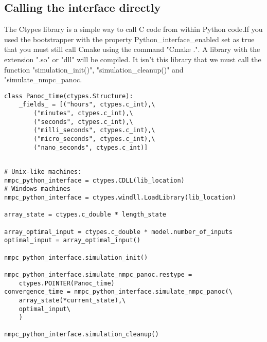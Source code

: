 \subsection{Calling the interface directly}
The Ctypes library is a simple way to call C  code from within Python code.If you used the bootstrapper  with the property Python\_interface\_enabled set as true that you must still call Cmake  using the command "Cmake .". A library with the extension ".so" or "dll" will be compiled. It isn't this library that we must call the function "simulation\_init()", "simulation\_cleanup()" and "simulate\_nmpc\_panoc.

\begin{lstlisting}[caption={ctype structure return by simulation},captionpos=b,label={lst:ctype structure return by simulation}]
class Panoc_time(ctypes.Structure):
	_fields_ = [("hours", ctypes.c_int),\
		("minutes", ctypes.c_int),\
		("seconds", ctypes.c_int),\
		("milli_seconds", ctypes.c_int),\
		("micro_seconds", ctypes.c_int),\
		("nano_seconds", ctypes.c_int)]
\end{lstlisting}

\begin{lstlisting}[caption={calling c code directly example},captionpos=b,label={lst:calling c code directly example}]

# Unix-like machines:
nmpc_python_interface = ctypes.CDLL(lib_location) 
# Windows machines
nmpc_python_interface = ctypes.windll.LoadLibrary(lib_location) 

array_state = ctypes.c_double * length_state

array_optimal_input = ctypes.c_double * model.number_of_inputs
optimal_input = array_optimal_input()

nmpc_python_interface.simulation_init()

nmpc_python_interface.simulate_nmpc_panoc.restype = 
	ctypes.POINTER(Panoc_time)
convergence_time = nmpc_python_interface.simulate_nmpc_panoc(\
	array_state(*current_state),\
	optimal_input\
	)

nmpc_python_interface.simulation_cleanup()
\end{lstlisting}